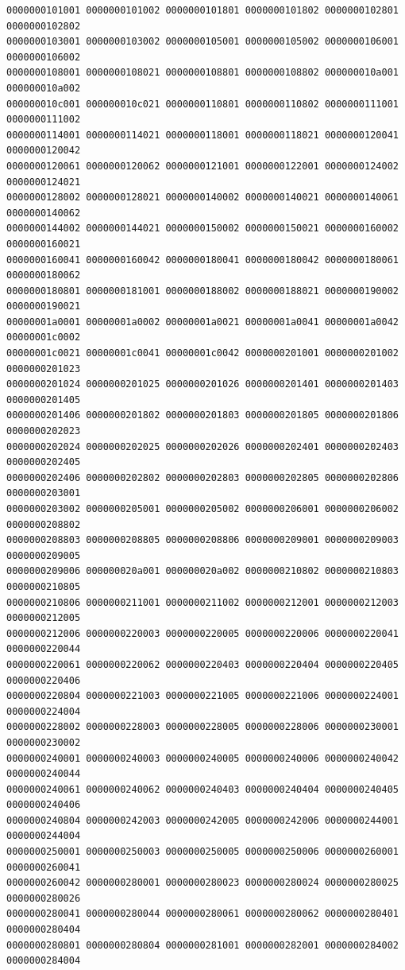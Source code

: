 \begin{Verbatim}[fontsize=\scriptsize]
0000000101001 0000000101002 0000000101801 0000000101802 0000000102801 0000000102802
0000000103001 0000000103002 0000000105001 0000000105002 0000000106001 0000000106002
0000000108001 0000000108021 0000000108801 0000000108802 000000010a001 000000010a002
000000010c001 000000010c021 0000000110801 0000000110802 0000000111001 0000000111002
0000000114001 0000000114021 0000000118001 0000000118021 0000000120041 0000000120042
0000000120061 0000000120062 0000000121001 0000000122001 0000000124002 0000000124021
0000000128002 0000000128021 0000000140002 0000000140021 0000000140061 0000000140062
0000000144002 0000000144021 0000000150002 0000000150021 0000000160002 0000000160021
0000000160041 0000000160042 0000000180041 0000000180042 0000000180061 0000000180062
0000000180801 0000000181001 0000000188002 0000000188021 0000000190002 0000000190021
00000001a0001 00000001a0002 00000001a0021 00000001a0041 00000001a0042 00000001c0002
00000001c0021 00000001c0041 00000001c0042 0000000201001 0000000201002 0000000201023
0000000201024 0000000201025 0000000201026 0000000201401 0000000201403 0000000201405
0000000201406 0000000201802 0000000201803 0000000201805 0000000201806 0000000202023
0000000202024 0000000202025 0000000202026 0000000202401 0000000202403 0000000202405
0000000202406 0000000202802 0000000202803 0000000202805 0000000202806 0000000203001
0000000203002 0000000205001 0000000205002 0000000206001 0000000206002 0000000208802
0000000208803 0000000208805 0000000208806 0000000209001 0000000209003 0000000209005
0000000209006 000000020a001 000000020a002 0000000210802 0000000210803 0000000210805
0000000210806 0000000211001 0000000211002 0000000212001 0000000212003 0000000212005
0000000212006 0000000220003 0000000220005 0000000220006 0000000220041 0000000220044
0000000220061 0000000220062 0000000220403 0000000220404 0000000220405 0000000220406
0000000220804 0000000221003 0000000221005 0000000221006 0000000224001 0000000224004
0000000228002 0000000228003 0000000228005 0000000228006 0000000230001 0000000230002
0000000240001 0000000240003 0000000240005 0000000240006 0000000240042 0000000240044
0000000240061 0000000240062 0000000240403 0000000240404 0000000240405 0000000240406
0000000240804 0000000242003 0000000242005 0000000242006 0000000244001 0000000244004
0000000250001 0000000250003 0000000250005 0000000250006 0000000260001 0000000260041
0000000260042 0000000280001 0000000280023 0000000280024 0000000280025 0000000280026
0000000280041 0000000280044 0000000280061 0000000280062 0000000280401 0000000280404
0000000280801 0000000280804 0000000281001 0000000282001 0000000284002 0000000284004

\end{Verbatim}

